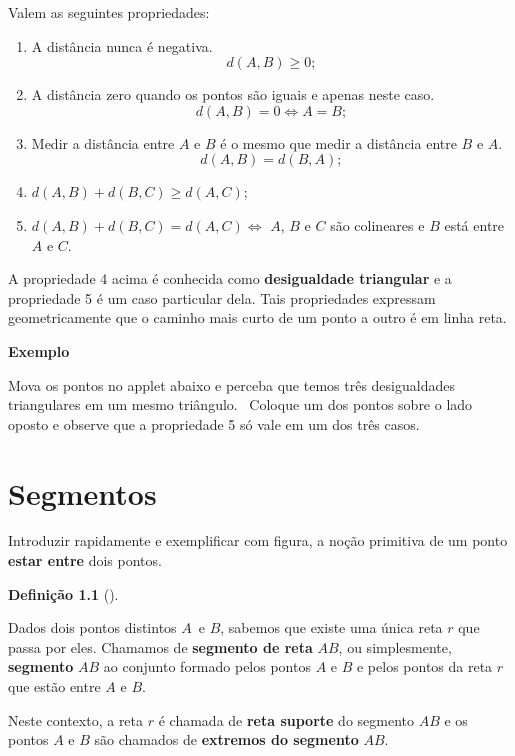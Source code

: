 \documentclass[
  brazilian,
  letterpaper,
  DIV=11,
  numbers=noendperiod]{scrreprt}
\providecommand{\tightlist}{%
  \setlength{\itemsep}{0pt}\setlength{\parskip}{0pt}}
\theoremstyle{definition}
\newtheorem{definition}{Definição}[chapter]
\theoremstyle{plain}
\theoremstyle{definition}
\theoremstyle{remark}
\begin{document}
Valem as seguintes propriedades:

\begin{enumerate}
\def\labelenumi{\arabic{enumi}.}
\tightlist
\item
  A distância nunca é negativa. \[ d(A,B)\ge0; \]
\item
  A distância zero quando os pontos são iguais e apenas neste caso.
  \[ d(A,B)=0\Leftrightarrow A=B;\]
\item
  Medir a distância entre \(A\) e \(B\) é o mesmo que medir a distância
  entre \(B\) e \(A\). \[d(A,B)=d(B,A);\]
\item
  \(d(A,B)+d(B,C)\ge d(A,C)\);
\item
  \(d(A,B)+d(B,C)=d(A,C)\Leftrightarrow\) \(A\), \(B\) e \(C\) são
  colineares e \(B\) está entre \(A\) e \(C\).
\end{enumerate}

A propriedade 4 acima é conhecida como \textbf{desigualdade triangular}
e a propriedade 5 é um caso particular dela. Tais propriedades expressam
geometricamente que o caminho mais curto de um ponto a outro é em linha
reta.

\textbf{Exemplo}

Mova os pontos no applet abaixo e perceba que temos três desigualdades
triangulares em um mesmo triângulo.~ Coloque um dos pontos sobre o lado
oposto e observe que a propriedade 5 só vale em um dos três casos.


\chapter{Segmentos}\label{segmentos}

Introduzir rapidamente e exemplificar com figura, a noção primitiva de
um ponto \textbf{estar entre} dois pontos.

\begin{definition}[]\protect\hypertarget{def-segmento}{}\label{def-segmento}

Dados dois pontos distintos \(A\)~e \(B\), sabemos que existe uma única
reta \(r\) que passa por eles. Chamamos de \textbf{segmento de reta}
\(AB\), ou simplesmente, \textbf{segmento} \(AB\) ao conjunto formado
pelos pontos \(A\) e \(B\) e pelos pontos da reta \(r\) que estão entre
\(A\) e \(B\).

Neste contexto, a reta \(r\) é chamada de \textbf{reta suporte} do
segmento \(AB\) e os pontos \(A\) e \(B\) são chamados de
\textbf{extremos do segmento} \(AB\).

\end{definition}
\end{document}

